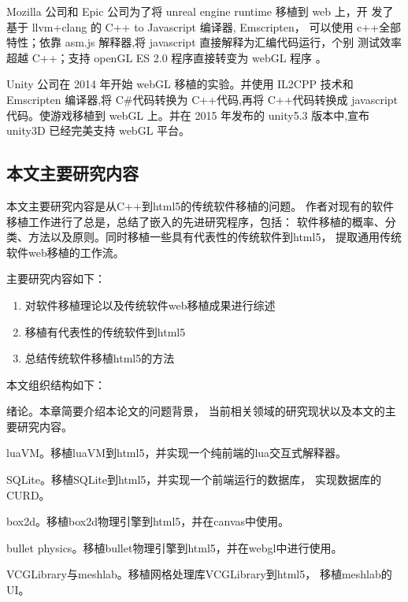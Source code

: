 Mozilla 公司和 Epic 公司为了将 unreal engine runtime 移植到 web 上，开
发了基于 llvm+clang 的 C++ to Javascript 编译器, Emscripten，
可以使用 c++全部特性；依靠 asm.js 解释器,将 javascript 直接解释为汇编代码运行，个别
测试效率超越 C++；支持 openGL ES 2.0 程序直接转变为 webGL 程序 。

Unity 公司在 2014 年开始 webGL 移植的实验。并使用 IL2CPP 技术和 Emscripten 编译器,将 C\#代码转换为 C++代码,再将 C++代码转换成 javascript 代码。使游戏移植到 webGL 上。并在 2015 年发布的 unity5.3 版本中,宣布 unity3D 已经完美支持 webGL 平台。


\subsection{本文主要研究内容}

本文主要研究内容是从C++到html5的传统软件移植的问题。
作者对现有的软件移植工作进行了总是，总结了嵌入的先进研究程序，包括：
软件移植的概率、分类、方法以及原则。同时移植一些具有代表性的传统软件到html5，
提取通用传统软件web移植的工作流。

主要研究内容如下：

\begin{enumerate}
    \item 对软件移植理论以及传统软件web移植成果进行综述
    \item 移植有代表性的传统软件到html5
    \item 总结传统软件移植html5的方法
\end{enumerate}

本文组织结构如下：

 绪论。本章简要介绍本论文的问题背景，
当前相关领域的研究现状以及本文的主要研究内容。

 luaVM。移植luaVM到html5，并实现一个纯前端的lua交互式解释器。

 SQLite。移植SQLite到html5，并实现一个前端运行的数据库，
实现数据库的CURD。

 box2d。移植box2d物理引擎到html5，并在canvas中使用。

 bullet physics。移植bullet物理引擎到html5，并在webgl中进行使用。

 VCGLibrary与meshlab。移植网格处理库VCGLibrary到html5，
移植meshlab的UI。

